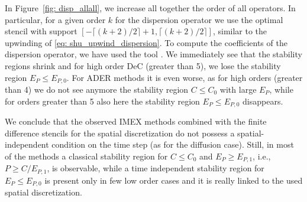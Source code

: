 In Figure~\ref{fig: disp_allall}, we increase all together the order of all operators. In particular, for a given order $k$ for the dispersion operator we use the optimal stencil with support $[-\lceil (k+2)/2 \rceil +1 ,\lceil (k+2)/2\rceil]$, similar to the upwinding of \eqref{eq: shu_upwind_dispersion}. To compute the coefficients of the dispersion operator, we have used the tool \cite{fdcc}. We immediately see that the stability regions shrink and for high order DeC (greater than 5), we lose the stability region $E_P\leq E_{P,0}$. For ADER methods it is even worse, as for high orders (greater than 4) we do not see anymore the stability region $C\leq C_0$ with large $E_P$, while for orders greater than 5 also here the stability region $E_P\leq E_{P,0}$ disappears.


We conclude that the observed IMEX methods combined with the finite difference stencils for the spatial discretization do not possess a spatial-independent condition on the time step (as for the diffusion case). 
Still, in most of the methods a classical stability region for $C\leq C_0$ and $E_P\geq E_{P,1}$, i.e., $P\geq C/E_{P,1}$, is observable, while a time independent stability region for $E_P\leq E_{P,0}$ is present only in few low order cases and it is really linked to the used spatial discretization. 
